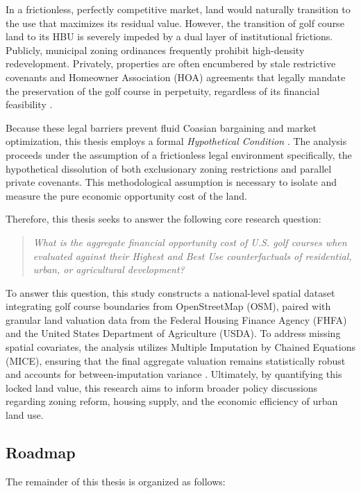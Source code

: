 \documentclass[10pt, letterpaper]{article}
\begin{document}
In a frictionless, perfectly competitive market, land would naturally transition to the use that maximizes its residual value. However, the transition of golf course land to its HBU is severely impeded by a dual layer of institutional frictions. Publicly, municipal zoning ordinances frequently prohibit high-density redevelopment. Privately, properties are often encumbered by stale restrictive covenants and Homeowner Association (HOA) agreements that legally mandate the preservation of the golf course in perpetuity, regardless of its financial feasibility \parencite{Ellickson2022, Korngold2024}. 

Because these legal barriers prevent fluid Coasian bargaining and market optimization, this thesis employs a formal \textit{Hypothetical Condition} \parencite{AppraisalInstitute2020}. The analysis proceeds under the assumption of a frictionless legal environment \textemdash specifically, the hypothetical dissolution of both exclusionary zoning restrictions and parallel private covenants. This methodological assumption is necessary to isolate and measure the pure economic opportunity cost of the land.

Therefore, this thesis seeks to answer the following core research question: 

\begin{quote}
\textit{What is the aggregate financial opportunity cost of U.S. golf courses when evaluated against their Highest and Best Use counterfactuals of residential, urban, or agricultural development?}
\end{quote}

To answer this question, this study constructs a national-level spatial dataset integrating golf course boundaries from OpenStreetMap (OSM), paired with granular land valuation data from the Federal Housing Finance Agency (FHFA) and the United States Department of Agriculture (USDA). To address missing spatial covariates, the analysis utilizes Multiple Imputation by Chained Equations (MICE), ensuring that the final aggregate valuation remains statistically robust and accounts for between-imputation variance \parencite{Burren2018, Rubin1987}. Ultimately, by quantifying this locked land value, this research aims to inform broader policy discussions regarding zoning reform, housing supply, and the economic efficiency of urban land use.


\subsection{Roadmap}
The remainder of this thesis is organized as follows: 
\end{document}
